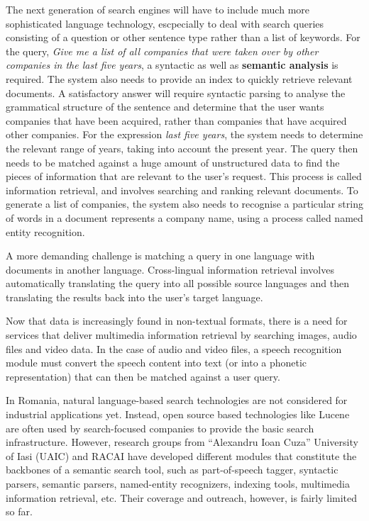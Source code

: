 \documentclass[]{../../metanetpaper}
\begin{document}
\begin{multicols}{2}
The next generation of search engines will have to include much more sophisticated language technology, escpecially to deal with search queries consisting of a question or other sentence type rather than a list of keywords. For the query, \textit{Give me a list of all companies that were taken over by other companies in the last five years}, a syntactic as well as \textbf{semantic analysis} is required. The system also needs to provide an index to quickly retrieve relevant documents. A satisfactory answer will require syntactic parsing to analyse the grammatical structure of the sentence and determine that the user wants companies that have been acquired, rather than companies that have acquired other companies. For the expression \textit{last five years}, the system needs to determine the relevant range of years, taking into account the present year. The query then needs to be matched against a huge amount of unstructured data to find the pieces of information that are relevant to the user’s request. This process is called information retrieval, and involves searching and ranking relevant documents. To generate a list of companies, the system also needs to recognise a particular string of words in a document represents a company name, using a process called named entity recognition.

A more demanding challenge is matching a query in one language with documents in another language. Cross-lingual information retrieval involves automatically translating the query into all possible source languages and then translating the results back into the user's target language.

Now that data is increasingly found in non-textual formats, there is a need for services that deliver multimedia information retrieval by searching images, audio files and video data. In the case of audio and video files, a speech recognition module must convert the speech content into text (or into a phonetic representation) that can then be matched against a user query.

In Romania, natural language-based search technologies are not considered for industrial applications yet. Instead, open source based technologies like Lucene are often used by search-focused companies to provide the basic search infrastructure. However, research groups from “Alexandru Ioan Cuza” University of Iasi (UAIC) and RACAI have developed different modules that constitute the backbones of a semantic search tool, such as part-of-speech tagger, syntactic parsers, semantic parsers, named-entity recognizers, indexing tools, multimedia information retrieval, etc. Their coverage and outreach, however, is fairly limited so far.


\end{multicols}
\end{document}
